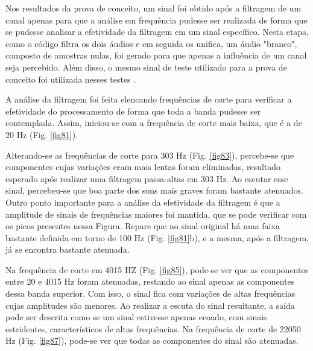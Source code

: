 Nos resultados da prova de conceito, um sinal foi obtido após a filtragem de um canal apenas para que a análise em frequência pudesse ser realizada de forma que se pudesse analisar a efetividade da filtragem em um sinal específico. Nesta etapa, como o código filtra os dois áudios e em seguida os unifica, um áudio "branco", composto de amostras nulas, foi gerado para que apenas a influência de um canal seja percebido. 
Além disso, o mesmo sinal de teste utilizado para a prova de conceito foi utilizada nesses testes \cite{track01}.



A análise da filtragem foi feita elencando frequências de corte para verificar a efetividade do processamento de forma que toda a banda pudesse ser contemplada. Assim, iniciou-se com a frequência de corte mais baixa, que é a de 20 Hz (Fig. \ref{fig81}). 

Alterando-se as frequências de corte para 303 Hz (Fig. \ref{fig83}), percebe-se que componentes cujas variações eram mais lentas foram eliminadas, resultado esperado após realizar uma filtragem passa-altas em 303 Hz. Ao escutar esse sinal, percebeu-se que boa parte dos sons mais graves foram bastante atenuados. Outro ponto importante para a análise da efetividade da filtragem é que a amplitude de sinais de frequências maiores foi mantida, que se pode verificar com os picos presentes nessa Figura. Repare que no sinal original há uma faixa bastante definida em torno de 100 Hz (Fig. \ref{fig81}b), e a mesma, após a filtragem, já se encontra bastante atenuada.

Na frequência de corte em 4015 HZ (Fig. \ref{fig85}), pode-se ver que as componentes entre 20 e 4015 Hz foram atenuadas, restando ao sinal apenas as componentes dessa banda superior. Com isso, o sinal fica com variações de altas frequências cujas amplitudes são menores. Ao realizar a escuta do sinal resultante, a saída pode ser descrita como se um sinal estivesse apenas ecoado, com sinais estridentes, característicos de altas frequências. 
Na frequência de corte de 22050 Hz (Fig. \ref{fig87}), pode-se ver que todas as componentes do sinal são atenuadas. 

